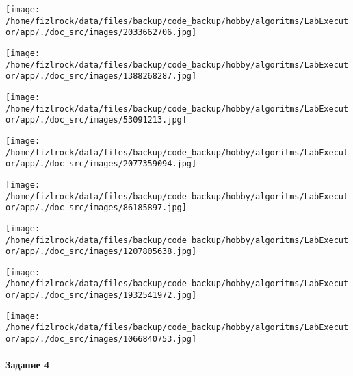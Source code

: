 \documentclass[a4paper, 12pt]{article}
\begin{document}
\texttt{[image: /home/fizlrock/data/files/backup/code\_backup/hobby/algoritms/LabExecutor/app/./doc\_src/images/2033662706.jpg]}

\texttt{[image: /home/fizlrock/data/files/backup/code\_backup/hobby/algoritms/LabExecutor/app/./doc\_src/images/1388268287.jpg]}

\texttt{[image: /home/fizlrock/data/files/backup/code\_backup/hobby/algoritms/LabExecutor/app/./doc\_src/images/53091213.jpg]}

\texttt{[image: /home/fizlrock/data/files/backup/code\_backup/hobby/algoritms/LabExecutor/app/./doc\_src/images/2077359094.jpg]}

\texttt{[image: /home/fizlrock/data/files/backup/code\_backup/hobby/algoritms/LabExecutor/app/./doc\_src/images/86185897.jpg]}

\texttt{[image: /home/fizlrock/data/files/backup/code\_backup/hobby/algoritms/LabExecutor/app/./doc\_src/images/1207805638.jpg]}

\texttt{[image: /home/fizlrock/data/files/backup/code\_backup/hobby/algoritms/LabExecutor/app/./doc\_src/images/1932541972.jpg]}

\texttt{[image: /home/fizlrock/data/files/backup/code\_backup/hobby/algoritms/LabExecutor/app/./doc\_src/images/1066840753.jpg]}
\pagebreak
\paragraph{Задание 4}
\end{document}

